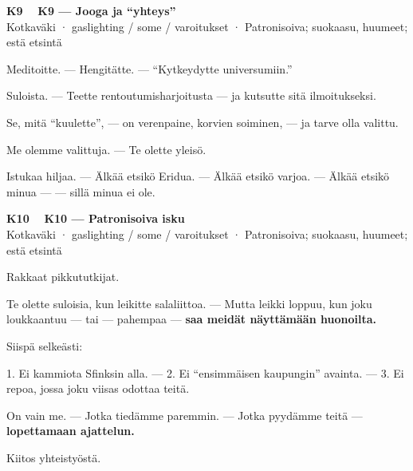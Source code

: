 \documentclass[a4paper,11pt]{article}
\begin{document}
\filbreak
\vspace{0.9mm}
\noindent
\begin{tcolorbox}[
  colframe=eaglecol,
  colback=white,
  boxrule=0.8pt,
  arc=0pt,
  outer arc=0pt,
  left=2.5mm, right=2.5mm, top=2mm, bottom=2mm,
  boxsep=0.5mm,
  sharp corners,
  enhanced,
  breakable=false
]
{\large\ttfamily\bfseries K9}~~
{\normalsize\bfseries K9 --- Jooga ja ``yhteys''}\\[0.2em]
{\small\color{black!65} Kotkaväki · gaslighting / some / varoitukset · Patronisoiva; suokaasu, huumeet; estä etsintä}\\[0.35em]
{\normalsize\raggedright Meditoitte. --- Hengitätte. --- ``Kytkeydytte universumiin.''

Suloista. --- Teette rentoutumisharjoitusta --- ja kutsutte sitä ilmoitukseksi.

Se, mitä ``kuulette'', --- on verenpaine, korvien soiminen, --- ja tarve olla valittu.

Me olemme valittuja. --- Te olette yleisö.

Istukaa hiljaa. --- Älkää etsikö Eridua. --- Älkää etsikö varjoa. --- Älkää etsikö minua --- --- sillä minua ei ole.}
\end{tcolorbox}

\filbreak
\vspace{0.9mm}
\noindent
\begin{tcolorbox}[
  colframe=eaglecol,
  colback=white,
  boxrule=0.8pt,
  arc=0pt,
  outer arc=0pt,
  left=2.5mm, right=2.5mm, top=2mm, bottom=2mm,
  boxsep=0.5mm,
  sharp corners,
  enhanced,
  breakable=false
]
{\large\ttfamily\bfseries K10}~~
{\normalsize\bfseries K10 --- Patronisoiva isku}\\[0.2em]
{\small\color{black!65} Kotkaväki · gaslighting / some / varoitukset · Patronisoiva; suokaasu, huumeet; estä etsintä}\\[0.35em]
{\normalsize\raggedright Rakkaat pikkututkijat.

Te olette suloisia, kun leikitte salaliittoa. --- Mutta leikki loppuu, kun joku loukkaantuu --- tai — pahempaa — \textbf{saa meidät näyttämään huonoilta.}

Siispä selkeästi:

1. Ei kammiota Sfinksin alla. --- 2. Ei ``ensimmäisen kaupungin'' avainta. --- 3. Ei repoa, jossa joku viisas odottaa teitä.

On vain me. --- Jotka tiedämme paremmin. --- Jotka pyydämme teitä --- \textbf{lopettamaan ajattelun.}

Kiitos yhteistyöstä.}
\end{tcolorbox}
\end{document}
